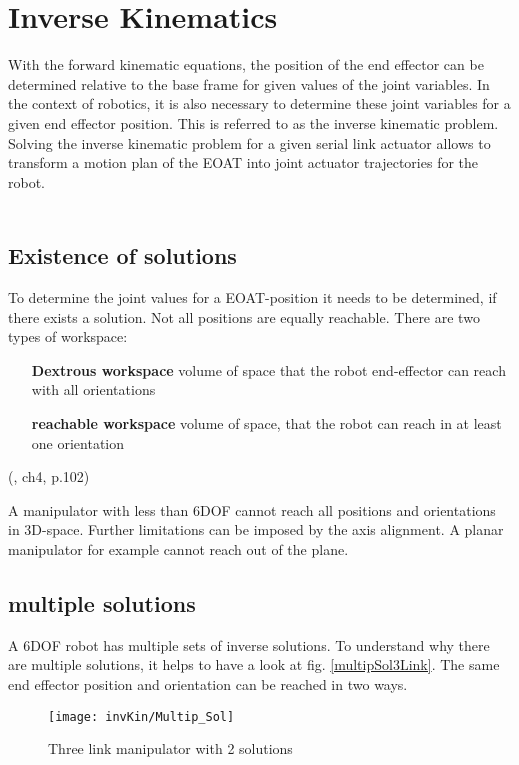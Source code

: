 \chapter{Inverse Kinematics}

With the forward kinematic equations, the position of the end effector can be determined relative to the base frame for given values of the joint variables.
In the context of robotics, it is also necessary to determine these joint variables for a given end effector position.
This is referred to as the inverse kinematic problem.
Solving the inverse kinematic problem for a given serial link actuator allows to transform a motion plan of the \ac{EOAT} into joint actuator trajectories for the robot.\\
\\
\section{Existence of solutions} \label{ExistSol}
To determine the joint values for a \ac{EOAT}-position it needs to be determined, if there exists a solution.
Not all positions are equally reachable.
There are two types of workspace:
\begin{itemize}[wide=\parindent] 
	\item[\textbf{Dextrous workspace}] volume of space that the robot end-effector can reach with all orientations
	\item[\textbf{reachable workspace}] volume of space, that the robot can reach in at least one orientation
\end{itemize}
(\cite{craig1986introduction}, ch4, p.102)

A manipulator with less than 6\ac{DOF} cannot reach all positions and orientations in 3D-space. Further limitations can be imposed by the axis alignment. A planar manipulator for example cannot reach  out of the plane. \cite{craig1986introduction}

\section{multiple solutions} \label{MultipSol}
A 6\ac{DOF} robot has multiple sets of inverse solutions. To understand why there are multiple solutions, it helps to have a look at fig. \ref{multipSol3Link}. The same end effector position and orientation can be reached in two ways. 

\begin{figure}[H]
	\texttt{[image: invKin/Multip\_Sol]}
	\caption{Three link manipulator with 2 solutions}
	\label{fig:multipSol3Link}
\end{figure}

